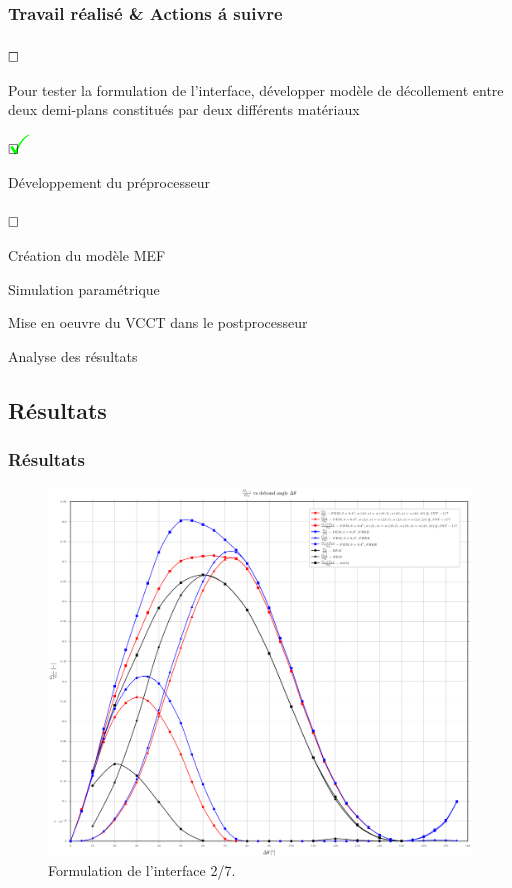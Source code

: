 \documentclass[first,firstsupp,lastsupp,handout,last,hyperref,table]{ETHclass}
\begin{document}
\begin{frame}
\frametitle{Travail r\'ealis\'e \& Actions \'a suivre}
\vspace{-0.5cm}
\scriptsize
\begin{list}{$\text{\rlap{\textcolor{white}{\huge$\mathbf{\checkmark}$}}}\square$}{}  
\item Pour tester la formulation de l'interface, d\'evelopper mod\`ele de d\'ecollement entre deux demi-plans constitu\'es par deux diff\'erents mat\'eriaux
\begin{list}{$\text{\rlap{\textcolor{green}{\huge$\mathbf{\checkmark}$}}}\square$}{}
\item D\'eveloppement du pr\'eprocesseur
\end{list}
\begin{list}{$\text{\rlap{\textcolor{white}{\huge$\mathbf{\checkmark}$}}}\square$}{}
\item Cr\'eation du mod\`ele MEF
\item Simulation param\'etrique
\item Mise en oeuvre du VCCT dans le postprocesseur
\item Analyse des r\'esultats
\end{list}
\end{list}
\end{frame}

\subsection{R\'esultats}

\begin{frame}
\frametitle{R\'esultats}
\vspace{-0.7cm}
\centering
\captionsetup[figure]{font=scriptsize,labelfont=scriptsize}
\begin{figure}[!h]
\centering
\includegraphics[height=0.7\textheight]{2017-04-29_AbqRunSummary_GsoverG0_FEM-BEM-comparison.pdf}
  \caption{\scriptsize Formulation de l'interface 2/7.}
  \label{fig:res1}
\end{figure}
\end{frame}
\end{document}
